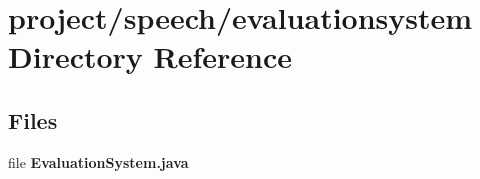 \section{project/speech/evaluationsystem Directory Reference}
\label{dir_20148f4887fc342b024796374ade48f3}
\subsection*{Files}
\begin{DoxyCompactItemize}
\item 
file {\bfseries Evaluation\+System.\+java}
\end{DoxyCompactItemize}

